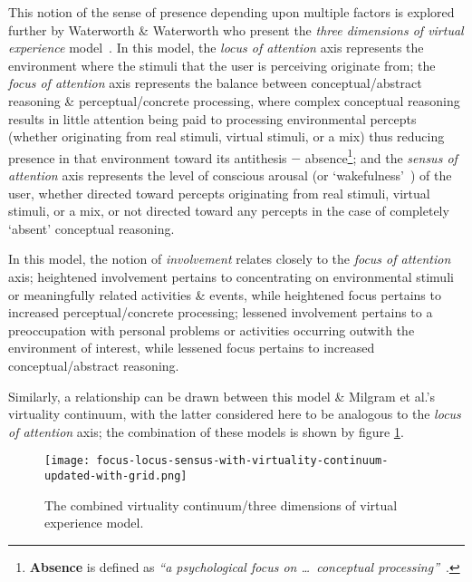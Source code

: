\newcommand{\absencefootnote}{\footnote{\textbf{Absence} is defined as \textit{``a psychological focus on \ldots\ conceptual processing''}~\cite{Waterworth2001}.}}

This notion of the sense of presence depending upon multiple factors is explored further by Waterworth \& Waterworth who present the \textit{three dimensions of virtual experience} model~\cite{Waterworth2001}. In this model, the \textit{locus of attention} axis represents the environment where the stimuli that the user is perceiving originate from; the \textit{focus of attention} axis represents the balance between conceptual/abstract reasoning \& perceptual/concrete processing, where complex conceptual reasoning results in little attention being paid to processing environmental percepts (whether originating from real stimuli, virtual stimuli, or a mix) thus reducing presence\presencefootnote{} in that environment toward its antithesis $-$ absence\absencefootnote{}; and the \textit{sensus of attention} axis represents the level of conscious arousal (or `wakefulness'~\cite{Laureys2009}) of the user, whether directed toward percepts originating from real stimuli, virtual stimuli, or a mix, or not directed toward any percepts in the case of completely `absent' conceptual reasoning.

In this model, the notion of \textit{involvement} relates closely to the \textit{focus of attention} axis; heightened involvement pertains to concentrating on environmental stimuli or meaningfully related activities \& events, while heightened focus pertains to increased perceptual/concrete processing; lessened involvement pertains to a preoccupation with personal problems or activities occurring outwith the environment of interest, while lessened focus pertains to increased conceptual/abstract reasoning.

Similarly, a relationship can be drawn between this model \& Milgram et al.'s virtuality continuum, with the latter considered here to be analogous to the \textit{locus of attention} axis; the combination of these models is shown by figure \ref{focus-locus-sensus-with-virtuality-continuum}.

\begin{figure}[h]
	\begin{center}
		\texttt{[image: focus-locus-sensus-with-virtuality-continuum-updated-with-grid.png]}
		\caption{The combined virtuality continuum/three dimensions of virtual experience model.}
		\label{focus-locus-sensus-with-virtuality-continuum}
	\end{center}	
\end{figure}

